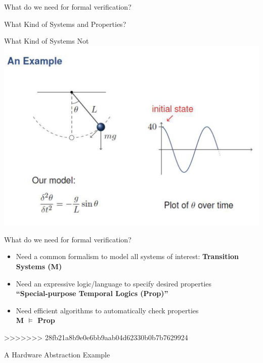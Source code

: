 \documentclass{beamer}
\begin{document}
\begin{frame}{What do we need for formal verification?}
\begin{frame}{What Kind of Systems and Properties?}
\end{frame}

\begin{frame}{What Kind of Systems Not} 
\includegraphics[scale=0.3]{pics/contdynamics.png}
\end{frame}

\begin{frame}{What do we need for formal verification?}
\begin{itemize}
\item<1-> Need a common formalism to model all systems of interest:
\textbf{Transition Systems (M)}

\item<2-> Need an expressive logic/language to specify desired properties \\
\textbf{``Special-purpose Temporal Logics (Prop)''}

\item<3-> Need efficient algorithms to automatically check properties \\
\textbf{M $\models$ Prop}
\end{itemize}
>>>>>>> 28fb21a8b9e0e6bb9aab04d62330b0b7b7629924
\end{frame}

\begin{frame}{A Hardware Abstraction Example}
\end{frame}


\end{frame}
\end{document}
